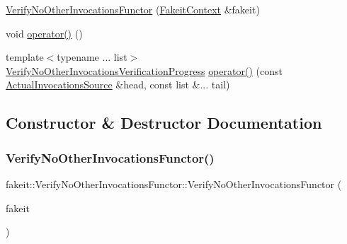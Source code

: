 \begin{DoxyCompactItemize}
\item 
\mbox{\hyperlink{classfakeit_1_1VerifyNoOtherInvocationsFunctor_ac17e4b84ac34bbdfe2f47a6d9e64e310}{Verify\+No\+Other\+Invocations\+Functor}} (\mbox{\hyperlink{structfakeit_1_1FakeitContext}{Fakeit\+Context}} \&fakeit)
\item 
void \mbox{\hyperlink{classfakeit_1_1VerifyNoOtherInvocationsFunctor_a40fae42fc436deb576fd08482382811a}{operator()}} ()
\item 
{\footnotesize template$<$typename ... list$>$ }\\\mbox{\hyperlink{classfakeit_1_1VerifyNoOtherInvocationsVerificationProgress}{Verify\+No\+Other\+Invocations\+Verification\+Progress}} \mbox{\hyperlink{classfakeit_1_1VerifyNoOtherInvocationsFunctor_a6f43e7d3b976534fa8f22abfad04004a}{operator()}} (const \mbox{\hyperlink{structfakeit_1_1ActualInvocationsSource}{Actual\+Invocations\+Source}} \&head, const list \&... tail)
\end{DoxyCompactItemize}


\subsection{Constructor \& Destructor Documentation}
\mbox{\label{classfakeit_1_1VerifyNoOtherInvocationsFunctor_ac17e4b84ac34bbdfe2f47a6d9e64e310}} 
\subsubsection{\texorpdfstring{VerifyNoOtherInvocationsFunctor()}{VerifyNoOtherInvocationsFunctor()}\hspace{0.1cm}{\footnotesize\ttfamily [1/9]}}
{\footnotesize\ttfamily fakeit\+::\+Verify\+No\+Other\+Invocations\+Functor\+::\+Verify\+No\+Other\+Invocations\+Functor (\begin{DoxyParamCaption}\item[{\mbox{\hyperlink{structfakeit_1_1FakeitContext}{Fakeit\+Context}} \&}]{fakeit }\end{DoxyParamCaption})\hspace{0.3cm}{\ttfamily [inline]}}

